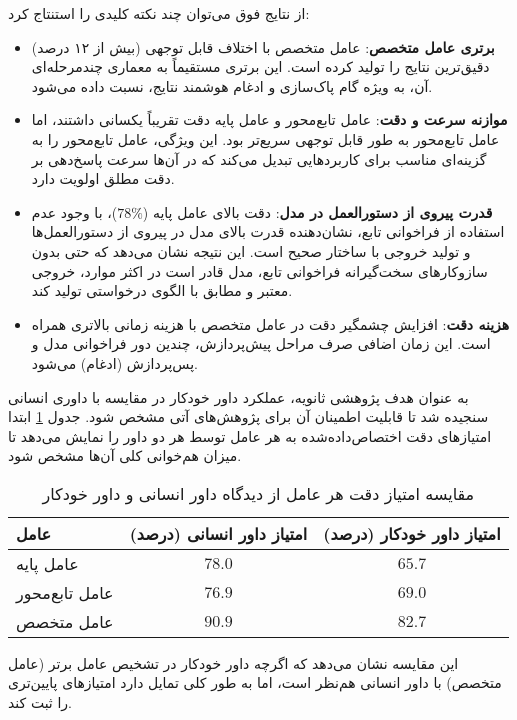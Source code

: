 \noindent
از نتایج فوق می‌توان چند نکته کلیدی را استنتاج کرد:
\begin{itemize}
    \item \textbf{برتری عامل متخصص}: عامل متخصص با اختلاف قابل توجهی (بیش از ۱۲ درصد) دقیق‌ترین نتایج را تولید کرده است. این برتری مستقیماً به معماری چندمرحله‌ای آن، به ویژه گام پاک‌سازی  و ادغام هوشمند نتایج، نسبت داده می‌شود.
    \item \textbf{موازنه سرعت و دقت}: عامل تابع‌محور و عامل پایه دقت تقریباً یکسانی داشتند، اما عامل تابع‌محور به طور قابل توجهی سریع‌تر بود. این ویژگی، عامل تابع‌محور را به گزینه‌ای مناسب برای کاربردهایی تبدیل می‌کند که در آن‌ها سرعت پاسخ‌دهی بر دقت مطلق اولویت دارد.
    \item \textbf{قدرت پیروی از دستورالعمل در مدل}: دقت بالای عامل پایه ($78\%$)، با وجود عدم استفاده از فراخوانی تابع، نشان‌دهنده قدرت بالای مدل  در پیروی از دستورالعمل‌ها و تولید خروجی با ساختار صحیح است. این نتیجه نشان می‌دهد که حتی بدون سازوکارهای سخت‌گیرانه فراخوانی تابع، مدل قادر است در اکثر موارد، خروجی  معتبر و مطابق با الگوی درخواستی تولید کند.
    \item \textbf{هزینه دقت}: افزایش چشمگیر دقت در عامل متخصص با هزینه زمانی بالاتری همراه است. این زمان اضافی صرف مراحل پیش‌پردازش، چندین دور فراخوانی مدل و پس‌پردازش (ادغام) می‌شود.
\end{itemize}

به عنوان هدف پژوهشی ثانویه، عملکرد داور خودکار در مقایسه با داوری انسانی سنجیده شد تا قابلیت اطمینان آن برای پژوهش‌های آتی مشخص شود. جدول \ref{tab:judge_comparison} ابتدا امتیازهای دقت اختصاص‌داده‌شده به هر عامل توسط هر دو داور را نمایش می‌دهد تا میزان هم‌خوانی کلی آن‌ها مشخص شود.

\begin{table}[h!]
\centering
\caption{مقایسه امتیاز دقت هر عامل از دیدگاه داور انسانی و داور خودکار}
\label{tab:judge_comparison}
\begin{tabular}{|l|c|c|}
\hline
\textbf{عامل} & \textbf{امتیاز داور انسانی (درصد)} & \textbf{امتیاز داور خودکار (درصد)} \\
\hline
عامل پایه & $78.0$ & $65.7$ \\
\hline
عامل تابع‌محور & $76.9$ & $69.0$ \\
\hline
عامل متخصص & \textbf{$90.9$} & \textbf{$82.7$} \\
\hline
\end{tabular}
\end{table}

\noindent
این مقایسه نشان می‌دهد که اگرچه داور خودکار در تشخیص عامل برتر (عامل متخصص) با داور انسانی هم‌نظر است، اما به طور کلی تمایل دارد امتیازهای پایین‌تری را ثبت کند. 


